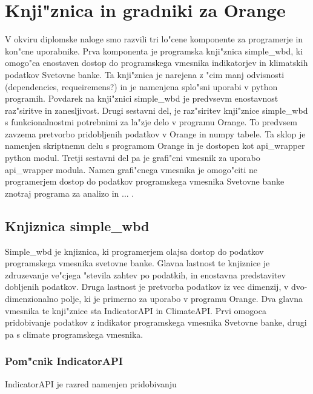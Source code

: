 \chapter{Knji"znica in gradniki za Orange}

V okviru diplomske naloge smo razvili tri lo"cene komponente za programerje in
kon"cne uporabnike. Prva komponenta je programska knji"znica simple\_wbd, ki
omogo"ca enostaven dostop do programskega vmesnika indikatorjev in klimatskih
podatkov Svetovne banke. Ta knji"znica je narejena z "cim manj odvisnosti
(dependencies, requeiremens?) in je namenjena splo"sni uporabi v python
programih. Povdarek na knji"znici simple\_wbd je predvsevm enostavnost 
raz"siritve in zanesljivost. Drugi sestavni del, je raz"siritev knji"znice
simple\_wbd s funkcionalnostmi potrebnimi za la"zje delo v programu Orange.
To predvsem zavzema pretvorbo pridobljenih podatkov v Orange in numpy tabele.
Ta sklop je namenjen skriptnemu delu s programom Orange in je dostopen kot
api\_wrapper python modul. Tretji sestavni del pa je grafi"cni vmesnik za
uporabo api\_wrapper modula. Namen grafi"cnega vmesnika je omogo"citi ne
programerjem dostop do podatkov programskega vmesnika Svetovne banke znotraj
programa za analizo in ... .

\section{Knjiznica simple\_wbd}

Simple\_wbd je knjiznica, ki programerjem olajsa dostop do podatkov
programskega vmesnika svetovne banke. Glavna lastnost te knjiznice je
zdruzevanje ve"cjega "stevila zahtev po podatkih, in enostavna predstavitev
dobljenih podatkov. Druga lastnost je pretvorba podatkov iz vec dimenzij, v
dvo-dimenzionalno polje, ki je primerno za uporabo v programu Orange. Dva
glavna vmesnika te knji"znice sta IndicatorAPI in ClimateAPI. Prvi omogoca
pridobivanje podatkov z indikator programskega vmesnika Svetovne banke, drugi
pa s climate programskega vmesnika.




% 



\subsection{Pom"cnik IndicatorAPI}

IndicatorAPI je razred namenjen pridobivanju 



